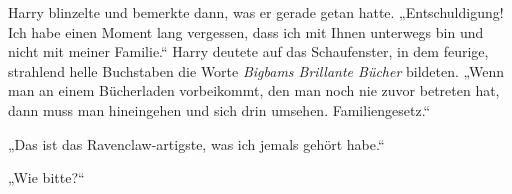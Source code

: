 Harry blinzelte und bemerkte dann, was er gerade getan hatte.
„Entschuldigung! Ich habe einen Moment lang vergessen, dass ich mit Ihnen unterwegs bin und nicht mit meiner Familie.“ Harry deutete auf das Schaufenster, in dem feurige, strahlend helle Buchstaben die Worte \emph{Bigbams Brillante Bücher} bildeten.
„Wenn man an einem Bücherladen vorbeikommt, den man noch nie zuvor betreten hat, dann muss man hineingehen und sich drin umsehen. Familiengesetz.“

„Das ist das Ravenclaw-artigste, was ich jemals gehört habe.“

„Wie bitte?“


